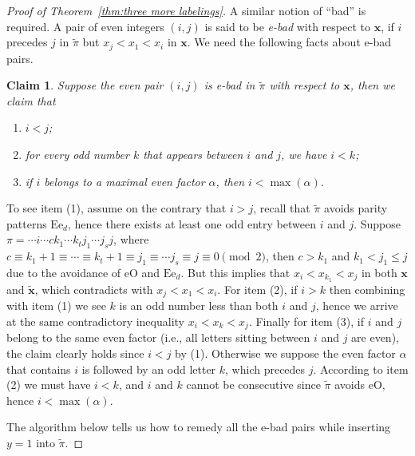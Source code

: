 \documentclass[11pt,reqno]{amsart}
\numberwithin{equation}{section}
\theoremstyle{plain}
\newtheorem{claim}[theorem]{Claim}
\theoremstyle{definition}
\newcommand{\bx}{\mathbf{x}}
\def\eO{\mathrm{eO}}
\def\Ee{\mathrm{Ee}}
\begin{document}
\begin{proof}[Proof of Theorem~\ref{thm:three more labelings}]
    A similar notion of ``bad'' is required. A pair of even integers $(i,j)$ is said to be {\it e-bad} with respect to $\bx$, if $i$ precedes $j$ in $\tilde{\pi}$ but $x_j<x_{1}<x_i$ in $\bx$. We need the following facts about e-bad pairs. 
    
    \begin{claim}\label{cla:bad pair IV}
    	Suppose the even pair $(i,j)$ is e-bad in $\tilde{\pi}$ with respect to $\bx$, then we claim that
    	\begin{enumerate}
    		\item $i<j$;
    		\item for every odd number $k$ that appears between $i$ and $j$, we have $i<k$;
    		\item if $i$ belongs to a maximal even factor $\alpha$, then $i<\max(\alpha)$.
    	\end{enumerate}
    \end{claim}
    
    To see item (1), assume on the contrary that $i>j$, recall that $\tilde{\pi}$ avoids parity patterns $\Ee_d$, hence there exists at least one odd entry between $i$ and $j$. Suppose $\pi=\cdots i \cdots ck_1\cdots k_tj_1\cdots j_sj$, where $c\equiv k_1+1\equiv\cdots\equiv k_t+1\equiv j_1\equiv\cdots j_s\equiv j\equiv 0\pmod 2$, then $c>k_1$ and $k_1<j_1\le j$ due to the avoidance of $\eO$ and $\Ee_d$. But this implies that $x_i<x_{k_1}<x_j$ in both $\bx$ and $\tilde{\bx}$, which contradicts with $x_j<x_1<x_i$. For item (2), if $i>k$ then combining with item (1) we see $k$ is an odd number less than both $i$ and $j$, hence we arrive at the same contradictory inequality $x_i<x_k<x_j$. Finally for item (3), if $i$ and $j$ belong to the same even factor (i.e., all letters sitting between $i$ and $j$ are even), the claim clearly holds since $i<j$ by (1). Otherwise we suppose the even factor $\alpha$ that contains $i$ is followed by an odd letter $k$, which precedes $j$. According to item (2) we must have $i<k$, and $i$ and $k$ cannot be consecutive since $\tilde{\pi}$ avoids $\eO$, hence $i<\max(\alpha)$.
    
    The algorithm below tells us how to remedy all the e-bad pairs while inserting $y=1$ into $\tilde{\pi}$. 
    

\end{proof}
\end{document}
